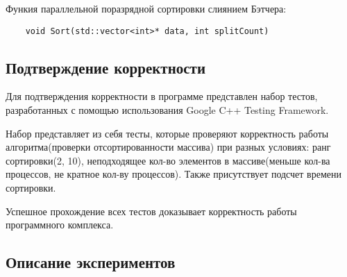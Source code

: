 \documentclass{report}
\begin{document}
Функия параллельной поразрядной сортировки слиянием Бэтчера:
\begin{lstlisting}
	void Sort(std::vector<int>* data, int splitCount)
\end{lstlisting}
\newpage

\begin{center}
\section*{Подтверждение корректности}
\end{center}

Для подтверждения корректности в программе представлен набор тестов, разработанных с помощью использования Google C++ Testing Framework.
\par Набор представляет из себя тесты, которые проверяют корректность работы алгоритма(проверки отсортированности массива) при разных условиях: ранг сортировки(2, 10), неподходящее кол-во элементов в массиве(меньше кол-ва процессов, не кратное кол-ву процессов). Также присутствует подсчет времени сортировки.
\par Успешное прохождение всех тестов доказывает корректность работы программного комплекса.
\newpage

\begin{center}
\section*{Описание экспериментов}
\end{center}
\end{document}

